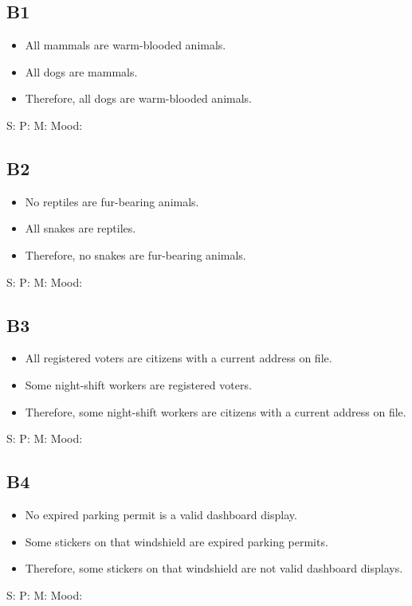 \documentclass[11pt]{article}
\newcommand{\syllblock}[3]{%
\begin{itemize}[leftmargin=1.2em]
\item #1
\item #2
\item #3
\end{itemize}
}
\begin{document}
\subsection*{B1}
\syllblock
{All mammals are warm-blooded animals.}
{All dogs are mammals.}
{Therefore, all dogs are warm-blooded animals.}
S: \underline{\hspace{1.7in}}
P: \underline{\hspace{1.7in}}
M: \underline{\hspace{1.7in}}
Mood: \underline{\hspace{1.0in}}

\subsection*{B2}
\syllblock
{No reptiles are fur-bearing animals.}
{All snakes are reptiles.}
{Therefore, no snakes are fur-bearing animals.}
S: \underline{\hspace{1.7in}}
P: \underline{\hspace{1.7in}}
M: \underline{\hspace{1.7in}}
Mood: \underline{\hspace{1.0in}}

\subsection*{B3}
\syllblock
{All registered voters are citizens with a current address on file.}
{Some night-shift workers are registered voters.}
{Therefore, some night-shift workers are citizens with a current address on file.}
S: \underline{\hspace{1.7in}}
P: \underline{\hspace{1.7in}}
M: \underline{\hspace{1.7in}}
Mood: \underline{\hspace{1.0in}}

\subsection*{B4}
\syllblock
{No expired parking permit is a valid dashboard display.}
{Some stickers on that windshield are expired parking permits.}
{Therefore, some stickers on that windshield are not valid dashboard displays.}
S: \underline{\hspace{1.7in}}
P: \underline{\hspace{1.7in}}
M: \underline{\hspace{1.7in}}
Mood: \underline{\hspace{1.0in}}
\end{document}
